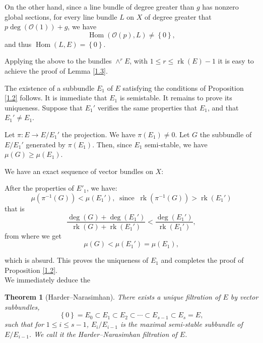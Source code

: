 \documentclass[12pt,a4paper]{book}
\DeclareMathOperator\rk{rk}
\DeclareMathOperator\Hom{Hom}
\def\OO{\mathscr{O}}
\newtheorem{thm}{Theorem}[chapter]
\theoremstyle{definition} \newtheorem{defn}[thm]{Definition}
\theoremstyle{definition} \newtheorem{ejs}[thm]{Examples}
\theoremstyle{definition} \newtheorem{ej}[thm]{Example}
\begin{document}
      On the other hand, since a line bundle of degree greater than $g$ has nonzero global sections, for every line bundle $L$ on $X$ of degree greater that $p\deg(\OO(1))+g$, we have
      \begin{equation*}
	\Hom(\OO(p),L)\neq \left\{ 0 \right\},
      \end{equation*}
      and thus $\Hom(L,E)=\left\{ 0 \right\}$.

      Applying the above to the bundles $\wedge^r E$, with $1\leq r\leq \rk(E)-1$ it is easy to achieve the proof of Lemma \ref{1.3}.

      The existence of a subbundle $E_1$ of $E$ satisfying the conditions of Proposition \ref{1.2} follows. It is immediate that $E_1$ is semistable. It remains to prove its uniqueness. Suppose that $E_1'$ verifies the same properties that $E_1$, and that $E_1'\neq E_1$. 

      Let $\pi: E \rightarrow E/E_1'$ the projection. We have $\pi(E_1)\neq 0$. Let $G$ the subbundle of $E/E_1'$ generated by $\pi(E_1)$. Then, since $E_1$ semi-stable, we have $\mu(G)\geq \mu(E_1)$. 

      We have an exact sequence of vector bundles on $X$:
      \begin{center}
      \end{center}

      After the properties of $E'_1$, we have:
      \begin{equation*}
	\mu(\pi^{-1}(G)) < \mu(E_1'), \ \text{ since }\ \rk(\pi^{-1}(G)) > \rk(E_1')
      \end{equation*}
      that is
      \begin{equation*}
	\frac{\deg(G) + \deg(E_1')}{\rk(G) + \rk(E_1')} < \frac{\deg(E_1')}{\rk(E_1')},
      \end{equation*}
      from where we get
      \begin{equation*}
	\mu(G) < \mu(E_1')=\mu(E_1),
      \end{equation*}

      which is absurd. This proves the uniqueness of $E_1$ and completes the proof of Proposition \ref{1.2}. \\

      We immediately deduce the
      \begin{thm}[Harder--Narasimhan] \label{1.4}
	There exists a unique filtration of $E$ by vector subbundles, 
	\begin{equation*}
	  \left\{ 0 \right\} = E_0 \subset E_1 \subset E_2 \subset \cdots \subset E_{s-1} \subset E_s = E,
	\end{equation*}
	such that for $1\leq i \leq s-1$, $E_i/E_{i-1}$ is the maximal semi-stable subbundle of $E/E_{i-1}$. We call it the \emph{Harder--Narasimhan filtration} of $E$.
      \end{thm}
\end{document}
